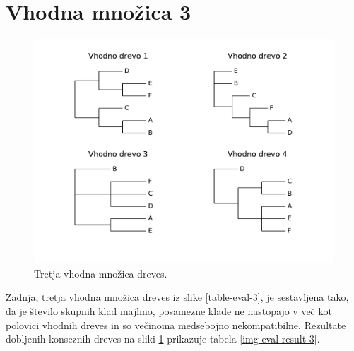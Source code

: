 \documentclass[a4paper, 12pt]{book}
\begin{document}
\section{Vhodna množica 3}
\begin{figure}[h!]
	\begin{center}
		\includegraphics[scale=0.63, clip=true, trim=0 2cm 0 0.5cm]{gfx/eval_input_3.pdf}
	\end{center}
	\caption{Tretja vhodna množica dreves.}
	\label{img-eval-input-3}
\end{figure}

Zadnja, tretja vhodna množica dreves iz slike \ref{table-eval-3}, je sestavljena tako, da je število skupnih klad majhno, posamezne klade ne nastopajo v več kot polovici vhodnih dreves in so večinoma medsebojno nekompatibilne. Rezultate dobljenih konseznih dreves na sliki \ref{img-eval-input-3} prikazuje tabela \ref{img-eval-result-3}.
\end{document}
